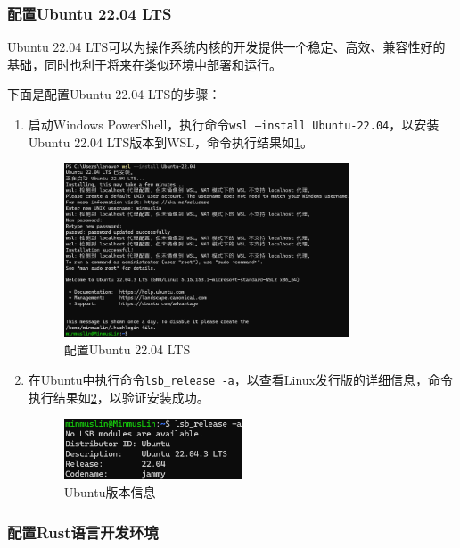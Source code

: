 \subsubsection{配置Ubuntu 22.04 LTS}

Ubuntu 22.04 LTS可以为操作系统内核的开发提供一个稳定、高效、兼容性好的基础，同时也利于将来在类似环境中部署和运行。

下面是配置Ubuntu 22.04 LTS的步骤：

\begin{enumerate}
    \item 启动Windows PowerShell，执行命令\texttt{wsl --install Ubuntu-22.04}，以安装Ubuntu 22.04 LTS版本到WSL，命令执行结果如\cref{fig:ConfigureUbuntu}。
          \begin{figure}[htbp]
              \centering
              \includegraphics[width=0.8\textwidth]{figures/ConfigureUbuntu.png}
              \caption{配置Ubuntu 22.04 LTS}
              \label{fig:ConfigureUbuntu}
          \end{figure}
    \item 在Ubuntu中执行命令\texttt{lsb\_release -a}，以查看Linux发行版的详细信息，命令执行结果如\cref{fig:UbuntuVersion}，以验证安装成功。
          \begin{figure}[htbp]
              \centering
              \includegraphics[width=0.5\textwidth]{figures/UbuntuVersion.png}
              \caption{Ubuntu版本信息}
              \label{fig:UbuntuVersion}
          \end{figure}
\end{enumerate}

\subsubsection{配置Rust语言开发环境}

